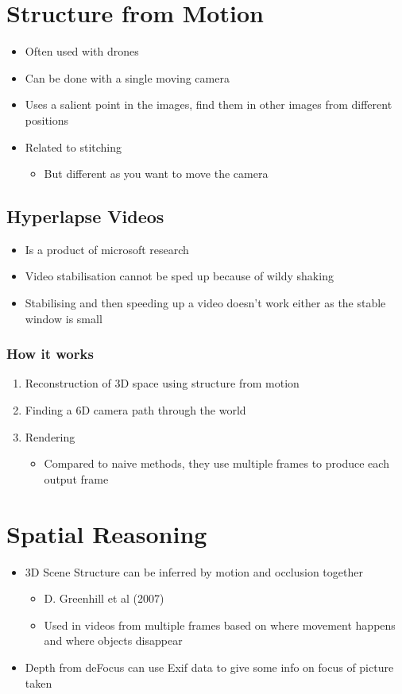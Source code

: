 \documentclass[a4paper]{article}
\begin{document}
\section{Structure from Motion}
\label{sec-10}
\begin{itemize}
\item Often used with drones
\item Can be done with a single moving camera
\item Uses a salient point in the images, find them in other images from different positions
\item Related to stitching
\begin{itemize}
\item But different as you want to move the camera
\end{itemize}
\end{itemize}


\subsection{Hyperlapse Videos}
\label{sec-10-1}
\begin{itemize}
\item Is a product of microsoft research
\item Video stabilisation cannot be sped up because of wildy shaking
\item Stabilising and then speeding up a video doesn't work either as the stable window is small
\end{itemize}
\subsubsection{How it works}
\label{sec-10-1-1}
\begin{enumerate}
\item Reconstruction of 3D space using structure from motion
\item Finding a 6D camera path through the world
\item Rendering
\begin{itemize}
\item Compared to naive methods, they use multiple frames to produce each output frame
\end{itemize}
\end{enumerate}

\section{Spatial Reasoning}
\label{sec-11}
\begin{itemize}
\item 3D Scene Structure can be inferred by motion and occlusion together
\begin{itemize}
\item D. Greenhill et al (2007)
\item Used in videos from multiple frames based on where movement happens and where objects disappear
\end{itemize}
\item Depth from deFocus can use Exif data to give some info on focus of picture taken
\end{itemize}
\end{document}
